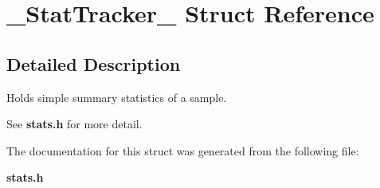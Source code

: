 \section{\_\-Stat\-Tracker\_\- Struct Reference}
\label{struct__StatTracker__}


\subsection{Detailed Description}
Holds simple summary statistics of a sample. 

See {\bf stats.h} for more detail. 



The documentation for this struct was generated from the following file:\begin{CompactItemize}
\item 
{\bf stats.h}\end{CompactItemize}
